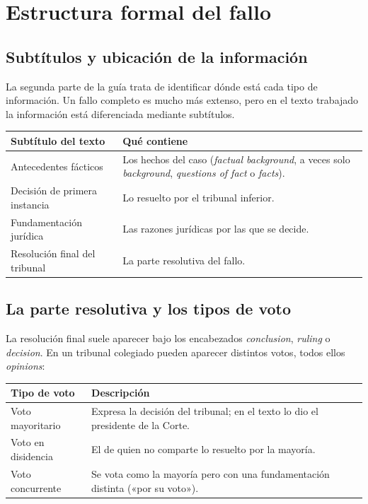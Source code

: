 \documentclass[12pt,oneside]{book}
\begin{document}
\chapter{Estructura formal del fallo}

\section{Subtítulos y ubicación de la información}

La segunda parte de la guía trata de identificar dónde está cada tipo de información. Un fallo completo es mucho más extenso, pero en el texto trabajado la información está diferenciada mediante subtítulos.

\begin{table}[H]
\centering
\begin{tabularx}{\textwidth}{
    >{\raggedright\arraybackslash}p{}
    >{\raggedright\arraybackslash}X
}
\toprule
\textbf{Subtítulo del texto} & \textbf{Qué contiene} \\
\midrule
Antecedentes fácticos & Los hechos del caso (\textit{factual background}, a veces solo \textit{background}, \textit{questions of fact} o \textit{facts}). \\
Decisión de primera instancia & Lo resuelto por el tribunal inferior. \\
Fundamentación jurídica & Las razones jurídicas por las que se decide. \\
Resolución final del tribunal & La parte resolutiva del fallo. \\
\bottomrule
\end{tabularx}
\end{table}

\section{La parte resolutiva y los tipos de voto}

La resolución final suele aparecer bajo los encabezados \textit{conclusion}, \textit{ruling} o \textit{decision}. En un tribunal colegiado pueden aparecer distintos votos, todos ellos \textit{opinions}:

\begin{table}[H]
\centering
\begin{tabularx}{\textwidth}{
    >{\raggedright\arraybackslash}p{}
    >{\raggedright\arraybackslash}X
}
\toprule
\textbf{Tipo de voto} & \textbf{Descripción} \\
\midrule
Voto mayoritario & Expresa la decisión del tribunal; en el texto lo dio el presidente de la Corte. \\
Voto en disidencia & El de quien no comparte lo resuelto por la mayoría. \\
Voto concurrente & Se vota como la mayoría pero con una fundamentación distinta («por su voto»). \\
\bottomrule
\end{tabularx}
\end{table}
\end{document}
